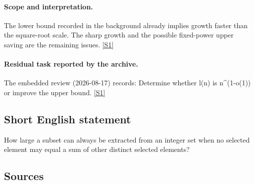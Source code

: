 \documentclass[11pt,a4paper]{article}
\newcommand{\sref}[2]{\hyperlink{source:#1:#2}{[S#2]}}
\begin{document}
\paragraph{Scope and interpretation.}

The lower bound recorded in the background already implies growth faster than the square-root scale. The sharp growth and the possible fixed-power upper saving are the remaining issues. \sref{2307}{1}

\paragraph{Residual task reported by the archive.}

The embedded review (2026-08-17) records: Determine whether l(n) is n\textasciicircum{}(1-o(1)) or improve the upper bound. \sref{2307}{1}

\subsection{Short English statement}

How large a subset can always be extracted from an integer set when no selected element may equal a sum of other distinct selected elements?

\subsection{Sources}
\end{document}
